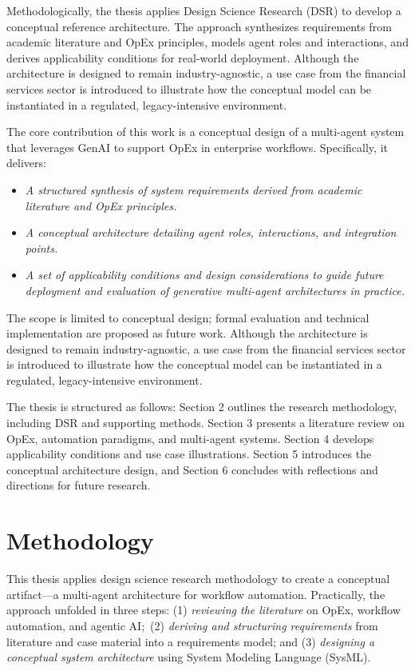 Methodologically, the thesis applies Design Science Research (DSR) to develop a conceptual reference architecture. The approach synthesizes requirements from academic literature and OpEx principles, models agent roles and interactions, and derives applicability conditions for real-world deployment.
Although the architecture is designed to remain industry-agnostic, a use case from the financial services sector is introduced to illustrate how the conceptual model can be instantiated in a regulated, legacy-intensive environment.

The core contribution of this work is a conceptual design of a multi-agent system that leverages GenAI to support OpEx in enterprise workflows. Specifically, it delivers:
\begin{itemize}
    \item \emph{A structured synthesis of system requirements derived from academic literature and OpEx principles.}
    \item \emph{A conceptual architecture detailing agent roles, interactions, and integration points.}
    \item \emph{A set of applicability conditions and design considerations to guide future deployment and evaluation of generative multi-agent architectures in practice.}
\end{itemize}

The scope is limited to conceptual design; formal evaluation and technical implementation are proposed as future work. Although the architecture is designed to remain industry-agnostic, a use case from the financial services sector is introduced to illustrate how the conceptual model can be instantiated in a regulated, legacy-intensive environment.

The thesis is structured as follows: Section 2 outlines the research methodology, including DSR and supporting methods. Section 3 presents a literature review on OpEx, automation paradigms, and multi-agent systems. Section 4 develops applicability conditions and use case illustrations. Section 5 introduces the conceptual architecture design, and Section 6 concludes with reflections and directions for future research.

\section{Methodology}\label{sec:method}
This thesis applies design science research methodology to create a conceptual artifact---a multi-agent architecture for workflow automation. Practically, the approach unfolded in three steps: (1) \emph{reviewing the literature} on OpEx, workflow automation, and agentic AI;~(2) \emph{deriving and structuring requirements} from literature and case material into a requirements model; and (3) \emph{designing a conceptual system architecture} using System Modeling Language (SysML).

